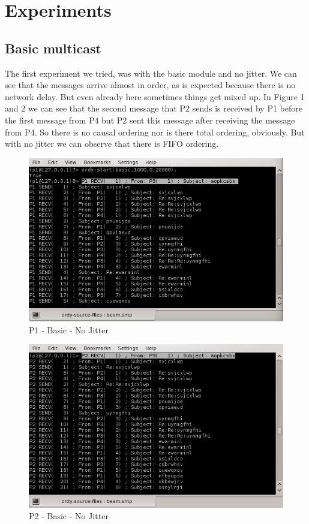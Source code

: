 \clearpage
\section{Experiments}

\subsection{Basic multicast}

The first experiment we tried, was with the basic module and no jitter. We can see that the messages arrive almost in order, as is expected because there is no network delay. But even already here sometimes things get mixed up. In Figure 1 and 2 we can see that the second message that P2 sends is received by P1 before the first message from P4 but P2 sent this message after receiving the message from P4. So there is no causal ordering nor is there total ordering, obviously. But with no jitter we can observe that there is FIFO ordering.

\begin{figure}[h!]
\centering
\includegraphics[scale=0.8]{sections/screenshots/p1_basic_jitter0.png}
\caption{P1 - Basic - No Jitter}
\label{fig:p1_basic_no_jitter}
\end{figure}

\begin{figure}[h!]
\centering
\includegraphics[scale=0.8]{sections/screenshots/p2_basic_jitter0.png}
\caption{P2 - Basic - No Jitter}
\label{fig:p2_basic_no_jitter}
\end{figure}

